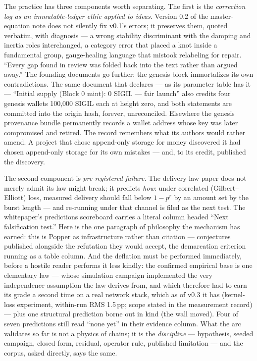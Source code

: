 \documentclass[10pt,a4paper]{article}
\begin{document}
The practice has three components worth separating. The first is the
\emph{correction log as an immutable-ledger ethic applied to ideas}. Version 0.2
of the master-equation note does not silently fix v0.1's errors; it preserves
them, quoted verbatim, with diagnosis — a wrong stability discriminant with the
damping and inertia roles interchanged, a category error that placed a knot inside
a fundamental group, gauge-healing language that mistook relabeling for repair.
``Every gap found in review was folded back into the text rather than argued
away.'' The founding documents go further: the genesis block immortalizes its own
contradictions. The same document that declares — as its parameter table has it —
``Initial supply (Block 0 mint): 0 SIGIL — fair launch'' also credits four genesis
wallets 100{,}000 SIGIL each at
height zero, and both statements are committed into the origin hash, forever,
unreconciled. Elsewhere the genesis provenance bundle permanently records a wallet
address whose key was later compromised and retired. The record remembers what its
authors would rather amend. A project that chose append-only storage for money
discovered it had chosen append-only storage for its own mistakes — and, to its
credit, published the discovery.

The second component is \emph{pre-registered failure}. The delivery-law paper does
not merely admit its law might break; it predicts \emph{how}: under correlated
(Gilbert--Elliott) loss, measured delivery should fall below $1-p^r$ by an amount
set by the burst length — and re-running under that channel is filed as the next
test. The whitepaper's predictions scoreboard carries a literal column headed
``Next falsification test.'' Here is the one paragraph of philosophy the mechanism
has earned: this is Popper as infrastructure rather than citation — conjectures
published alongside the refutation they would accept, the demarcation criterion
running as a table column. And the deflation must be performed immediately,
before a hostile reader performs it less kindly: the confirmed empirical base is
one elementary law — whose simulation campaign implemented the very independence
assumption the law derives from, and which therefore had to earn its grade a second
time on a real network stack, which as of v0.3 it has (kernel-loss experiment,
within-run RMS 1.5\,pp; scope stated in the measurement record) — plus
one structural prediction borne out in kind (the wall moved). Four of seven
predictions still read ``none yet'' in their evidence column. What the arc validates so far is not a physics of
chains; it is the \emph{discipline} — hypothesis, seeded campaign, closed form,
residual, operator rule, published limitation — and the corpus, asked directly,
says the same.
\end{document}

